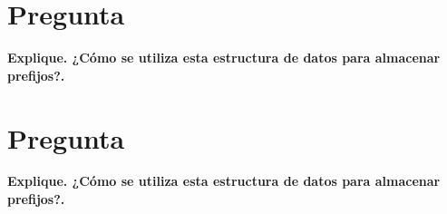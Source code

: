 

\section{Pregunta}
\textbf{Explique. ¿Cómo se utiliza esta estructura de datos para almacenar prefijos?.}\\



\section{Pregunta}
\textbf{Explique. ¿Cómo se utiliza esta estructura de datos para almacenar prefijos?.}\\

